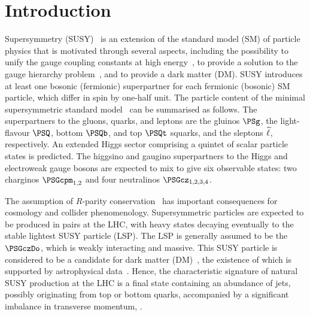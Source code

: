 \maketitle


\section{Introduction}
\label{sec:introduction}

Supersymmetry (SUSY)~\cite{ref:SUSY-1, ref:SUSY0, ref:SUSY3,
  ref:SUSY1} is an extension of the standard model (SM) of particle
physics that is motivated through several aspects, including the
possibility to unify the gauge coupling constants at high
energy~\cite{Dimopoulos:1981yj, Ibanez:1981yh, Marciano:1981un}, to
provide a solution to the gauge hierarchy
problem~\cite{ref:hierarchy1, ref:hierarchy2}, and to provide a dark
matter (DM). SUSY introduces at least one bosonic (fermionic)
superpartner for each fermionic (bosonic) SM particle, which differ in
spin by one-half unit. The particle content of the minimal
supersymmetric standard model~\cite{ref:SUSY2} can be summarised as
follows. The superpartners to the gluons, quarks, and leptons are the
gluinos $\PSg$, the light-flavour $\PSQ$, bottom $\PSQb$, and top
$\PSQt$ squarks, and the sleptons $\widetilde{\ell}$, respectively. An extended
Higgs sector comprising a quintet of scalar particle states is
predicted. The higgsino and gaugino superpartners to the Higgs and
electroweak gauge bosons are expected to mix to give six observable
states: two charginos $\PSGcpm_{1,2}$ and four neutralinos
$\PSGcz_{1,2,3,4}$. 

The assumption of $R$-parity conservation~\cite{Farrar:1978xj} has
important consequences for cosmology and collider
phenomenology. Supersymmetric particles are expected to be produced in
pairs at the LHC, with heavy states decaying eventually to the stable
lightest SUSY particle (LSP). The LSP is generally assumed to be the
$\PSGczDo$, which is weakly interacting and massive. This SUSY
particle is considered to be a candidate for dark matter
(DM)~\cite{Jungman:1995df}, the existence of which is supported by
astrophysical data~\cite{1674-1137-38-9-090001}. Hence, the
characteristic signature of natural SUSY production at the LHC is a
final state containing an abundance of jets, possibly originating from
top or bottom quarks, accompanied by a significant imbalance in
transverse momentum, \ptvecmiss. 

